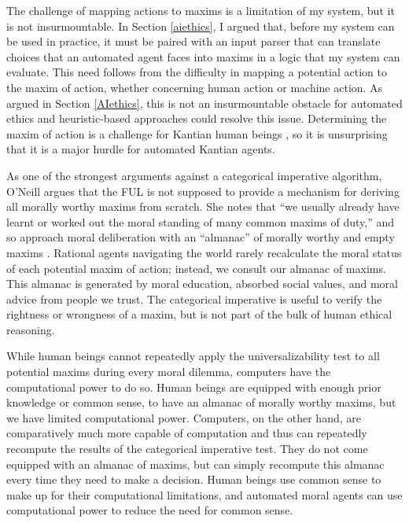 \begin{isabellebody}
\begin{isamarkuptext}
The challenge of mapping actions to maxims is a limitation of my system, but it is not insurmountable. In Section \ref{aiethics},
I argued that, before my system can be used in practice, it must be paired with an input parser that can
translate choices that an automated agent faces into maxims in a logic that my system can
evaluate. This need follows from the difficulty in mapping a potential action
to the maxim of action, whether concerning human action or machine action. As argued in Section \ref{AIethics},  
this is not an insurmountable obstacle for automated ethics and heuristic-based approaches could resolve
this issue. Determining the maxim of action is a challenge for Kantian human beings \citep{oneilluniversallaws}, 
so it is unsurprising that it is a major hurdle for automated Kantian agents. 

As one of the strongest arguments against a categorical imperative algorithm, O'Neill argues that 
the FUL is not supposed to provide a mechanism for deriving all morally worthy maxims from scratch. She notes
that ``we usually already have learnt or worked out the moral standing of many common maxims of duty,''
and so approach moral deliberation with an ``almanac'' of morally worthy and empty maxims \citep[394]{oneilluniversallaws}. 
Rational agents navigating the world rarely recalculate the moral status of each potential maxim of 
action; instead, we consult our almanac of maxims. This almanac is generated by moral education, 
absorbed social values, and moral advice from people we trust. The categorical imperative is useful 
to verify the rightness or wrongness of a maxim, but is not part of the bulk of human ethical reasoning.

While human beings cannot repeatedly apply the universalizability test to all potential maxims during 
every moral dilemma, computers have the computational power to do so. Human beings are 
equipped with enough prior knowledge or common sense, to have an almanac of morally worthy maxims,
but we have limited computational power. Computers, on the other hand, are comparatively
much more capable of computation and thus can repeatedly recompute the results of the categorical
imperative test. They do not come equipped with an almanac of maxims, but can simply recompute this
almanac every time they need to make a decision. Human beings use common sense to make up for their computational
limitations, and automated moral agents can use computational power to reduce the need for common sense.


\end{isamarkuptext}
\end{isabellebody}
